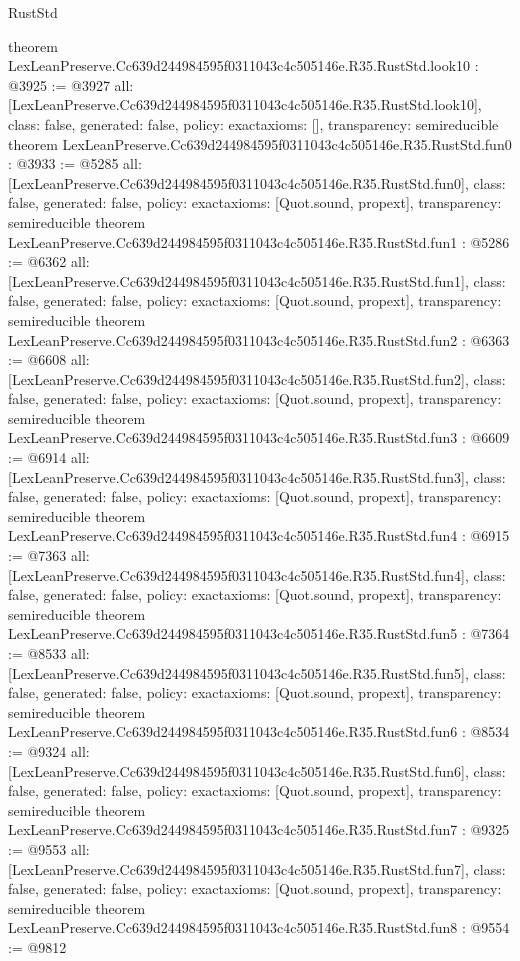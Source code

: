 \begin{lexlean}{RustStd}
\begin{coremodule}
{}
theorem LexLeanPreserve.Cc639d244984595f0311043c4c505146e.R35.RustStd.look10 : @3925 := @3927 {
  all: [LexLeanPreserve.Cc639d244984595f0311043c4c505146e.R35.RustStd.look10],
  class: false,
  generated: false,
  policy: exact{axioms: []},
  transparency: semireducible
}
theorem LexLeanPreserve.Cc639d244984595f0311043c4c505146e.R35.RustStd.fun0 : @3933 := @5285 {
  all: [LexLeanPreserve.Cc639d244984595f0311043c4c505146e.R35.RustStd.fun0],
  class: false,
  generated: false,
  policy: exact{axioms: [Quot.sound, propext]},
  transparency: semireducible
}
theorem LexLeanPreserve.Cc639d244984595f0311043c4c505146e.R35.RustStd.fun1 : @5286 := @6362 {
  all: [LexLeanPreserve.Cc639d244984595f0311043c4c505146e.R35.RustStd.fun1],
  class: false,
  generated: false,
  policy: exact{axioms: [Quot.sound, propext]},
  transparency: semireducible
}
theorem LexLeanPreserve.Cc639d244984595f0311043c4c505146e.R35.RustStd.fun2 : @6363 := @6608 {
  all: [LexLeanPreserve.Cc639d244984595f0311043c4c505146e.R35.RustStd.fun2],
  class: false,
  generated: false,
  policy: exact{axioms: [Quot.sound, propext]},
  transparency: semireducible
}
theorem LexLeanPreserve.Cc639d244984595f0311043c4c505146e.R35.RustStd.fun3 : @6609 := @6914 {
  all: [LexLeanPreserve.Cc639d244984595f0311043c4c505146e.R35.RustStd.fun3],
  class: false,
  generated: false,
  policy: exact{axioms: [Quot.sound, propext]},
  transparency: semireducible
}
theorem LexLeanPreserve.Cc639d244984595f0311043c4c505146e.R35.RustStd.fun4 : @6915 := @7363 {
  all: [LexLeanPreserve.Cc639d244984595f0311043c4c505146e.R35.RustStd.fun4],
  class: false,
  generated: false,
  policy: exact{axioms: [Quot.sound, propext]},
  transparency: semireducible
}
theorem LexLeanPreserve.Cc639d244984595f0311043c4c505146e.R35.RustStd.fun5 : @7364 := @8533 {
  all: [LexLeanPreserve.Cc639d244984595f0311043c4c505146e.R35.RustStd.fun5],
  class: false,
  generated: false,
  policy: exact{axioms: [Quot.sound, propext]},
  transparency: semireducible
}
theorem LexLeanPreserve.Cc639d244984595f0311043c4c505146e.R35.RustStd.fun6 : @8534 := @9324 {
  all: [LexLeanPreserve.Cc639d244984595f0311043c4c505146e.R35.RustStd.fun6],
  class: false,
  generated: false,
  policy: exact{axioms: [Quot.sound, propext]},
  transparency: semireducible
}
theorem LexLeanPreserve.Cc639d244984595f0311043c4c505146e.R35.RustStd.fun7 : @9325 := @9553 {
  all: [LexLeanPreserve.Cc639d244984595f0311043c4c505146e.R35.RustStd.fun7],
  class: false,
  generated: false,
  policy: exact{axioms: [Quot.sound, propext]},
  transparency: semireducible
}
theorem LexLeanPreserve.Cc639d244984595f0311043c4c505146e.R35.RustStd.fun8 : @9554 := @9812 {
}
\end{coremodule}
\end{lexlean}
